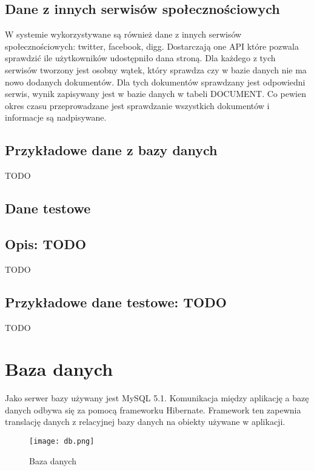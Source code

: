 \subsection*{Dane z innych serwisów społecznościowych}

W systemie wykorzystywane są również dane z innych serwisów społecznościowych: twitter, facebook, digg. Dostarczają one API które pozwala sprawdzić ile użytkowników udostępniło dana stroną. Dla każdego z tych serwisów tworzony jest osobny wątek, który sprawdza czy w bazie danych nie ma nowo dodanych dokumentów. Dla tych dokumentów sprawdzany jest odpowiedni serwis, wynik zapisywany jest w bazie danych w tabeli DOCUMENT. Co pewien okres czasu przeprowadzane jest sprawdzanie wszystkich dokumentów i informacje są nadpisywane. 


\subsection*{Przykładowe dane z bazy danych}

TODO

\subsection{Dane testowe}

\subsection * {Opis: TODO}
TODO

\subsection*{Przykładowe dane testowe: TODO}

TODO
\section{Baza danych}

Jako serwer bazy używany jest MySQL 5.1. Komunikacja między aplikację a bazę danych odbywa się za pomocą frameworku Hibernate. Framework ten zapewnia translację danych z relacyjnej bazy danych na obiekty używane w aplikacji. 


\begin{figure}[h]
\centering
\texttt{[image: db.png]}
\caption{Baza danych}
\label{fig:db_fig}
\end{figure}


